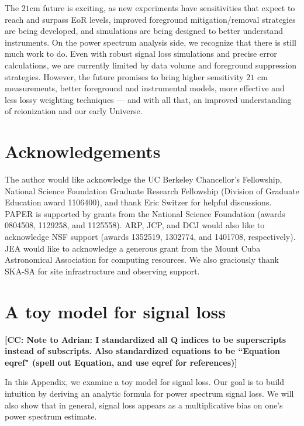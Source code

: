 \documentclass[preprint2,numberedappendix,tighten]{aastex6}  %
\newcommand{\cc}[1]{{\color{purple} \textbf{[CC: #1]}}}
\begin{document}
The $21$cm future is exciting, as new experiments have sensitivities that expect to reach and surpass EoR levels, improved foreground mitigation/removal strategies are being developed, and simulations are being designed to better understand instruments. On the power spectrum analysis side, we recognize that there is still much work to do. Even with robust signal loss simulations and precise error calculations, we are currently limited by data volume and foreground suppression strategies. However, the future promises to bring higher sensitivity $21$ cm measurements, better foreground and instrumental models, more effective and less lossy weighting techniques --- and with all that, an improved understanding of reionization and our early Universe.


\section{Acknowledgements}
The author would like acknowledge the UC Berkeley Chancellor's Fellowship, National Science Foundation Graduate Research Fellowship (Division of Graduate Education award 1106400), and thank Eric Switzer for helpful discussions. PAPER is supported by grants from the National Science Foundation (awards 0804508, 1129258, and 1125558). ARP, JCP, and DCJ would also like to acknowledge NSF support (awards 1352519, 1302774, and 1401708, respectively). JEA would like to acknowledge a generous grant from the Mount Cuba Astronomical Association for computing resources. We also graciously thank SKA-SA for site infrastructure and observing support.
\label{sec:Ack}


\appendix
\section{A toy model for signal loss}
\label{sec:sigloss_appendix}

\cc{Note to Adrian: I standardized all Q indices to be superscripts instead of subscripts. Also standardized equations to be ``Equation eqref" (spell out Equation, and use eqref for references)}

In this Appendix, we examine a toy model for signal loss. Our goal is to build intuition by deriving an analytic formula for power spectrum signal loss. We will also show that in general, signal loss appears as a multiplicative bias on one's power spectrum estimate.
\end{document}
